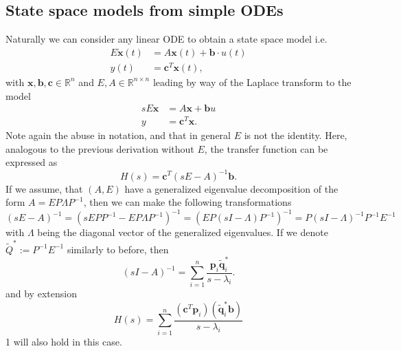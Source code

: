 \documentclass{article}
\begin{document}
	\subsection{State space models from simple ODEs}
	Naturally we can consider any linear ODE to obtain a state space model i.e.
	\begin{equation}\label{eq:simpleODE}
		\begin{aligned}
			E\dot{\mathbf{x}}(t)&=A\mathbf{x}(t)+\mathbf{b}\cdot u(t)\\
			y(t)&=\mathbf{c}^{T}\mathbf{x}(t),
		\end{aligned}
	\end{equation}
	with $\mathbf{x},\mathbf{b},\mathbf{c}\in\mathbb{R}^{n}$ and $E,A\in\mathbb{R}^{n\times n}$ leading by way of the Laplace transform to the model
	\begin{equation}\label{eq:SSmodelfromSimpleODE}
		\begin{aligned}
			sE\mathbf{x}&=A\mathbf{x}+\mathbf{b}u\\
			y&=\mathbf{c}^{T}\mathbf{x}.
		\end{aligned}
	\end{equation}
	Note again the abuse in notation, and that in general $E$ is not the identity.
	Here, analogous to the previous derivation without $E$, the transfer function can be expressed as 
	\begin{equation}\label{eq:Hs-matrix-gen}
		H(s) = \textbf{c}^T \left(sE - A\right)^{-1} \textbf{b}.
	\end{equation}
	If we assume, that $(A, E)$ have a generalized eigenvalue decomposition of the form $A = E P \Lambda P^{-1}$, then we can make the following transformations
	\begin{equation}
		\left(sE - A\right)^{-1} = \left(sEP P^{-1}-EP\Lambda P^{-1}\right)^{-1} = \left(EP\left(s I -\Lambda\right) P^{-1}\right)^{-1} = P \left(s I -\Lambda\right)^{-1} P^{-1} E^{-1}
	\end{equation}
	with $\Lambda$ being the diagonal vector of the generalized eigenvalues. If we denote $\tilde{Q}^\ast := P^{-1}E^{-1} $ similarly to before, then 
	\begin{equation}
		(sI-A)^{-1}=\sum_{i=1}^{n}\frac{\mathbf{p}_i\tilde{\mathbf{q}}_i^{\ast}}{s-\lambda_i}.
	\end{equation}
	and by extension
	\begin{equation}
		H(s)
		=\sum_{i=1}^n \frac{(\mathbf{c}^T\mathbf{p}_i)(\tilde{\mathbf{q}}_i^{\ast}\mathbf{b})}{s-\lambda_i}
	\end{equation}1
	will also hold in this case.
	
\end{document}
